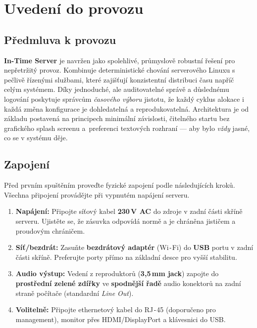 \documentclass[11pt,a4paper]{book}
\begin{document}
\mainmatter
\chapter{Uvedení do provozu}

\section*{Předmluva k provozu}
\noindent
\textbf{In-Time Server} je navržen jako spolehlivé, průmyslově robustní řešení pro nepřetržitý provoz. Kombinuje deterministické chování serverového Linuxu s pečlivě řízenými službami, které zajišťují konzistentní distribuci času napříč celým systémem. Díky jednoduché, ale auditovatelné správě a důslednému logování poskytuje správcům \emph{časového výboru} jistotu, že každý cyklus alokace i každá změna konfigurace je dohledatelná a reprodukovatelná. Architektura je od základu postavená na principech minimální závislosti, čitelného startu bez grafického splash screenu a~preferenci textových rozhraní --- aby bylo \emph{vždy} jasné, co se v systému děje.

\section{Zapojení}
\noindent
Před prvním spuštěním proveďte fyzické zapojení podle následujících kroků. Všechna připojení provádějte při vypnutém napájení serveru.

\begin{enumerate}
  \item \textbf{Napájení:} Připojte síťový kabel \textbf{230\,V AC} do zdroje v zadní části skříně serveru. Ujistěte se, že zásuvka odpovídá normě a je chráněna jističem a proudovým chráničem.
  \item \textbf{Síť/bezdrát:} Zasuňte \textbf{bezdrátový adaptér} (Wi\texttt{-}Fi) do \textbf{USB} portu v zadní části skříně. Preferujte porty přímo na základní desce pro vyšší stabilitu.
  \item \textbf{Audio výstup:} Vedení z reproduktorů (\textbf{3{,}5\,mm jack}) zapojte do \textbf{prostřední zelené zdířky} ve \textbf{spodnější řadě} audio konektorů na zadní straně počítače (standardní \emph{Line Out}).
  \item \textbf{Volitelně:} Připojte ethernetový kabel do RJ\texttt{-}45 (doporučeno pro management), monitor přes HDMI/DisplayPort a klávesnici do USB.
\end{enumerate}
\end{document}
